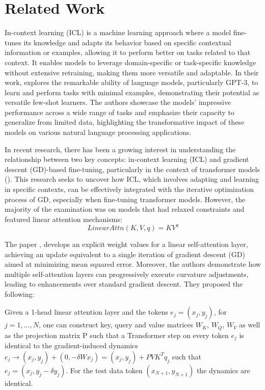 \documentclass[11pt]{article}
\begin{document}
\section{Related Work}
In-context learning (ICL) is a machine learning approach where a model fine-tunes its knowledge and adapts its behavior based on specific contextual information or examples, allowing it to perform better on tasks related to that context.
It enables models to leverage domain-specific or task-specific knowledge without extensive retraining, making them more versatile and adaptable.
In their work, \cite{NEURIPS2020_1457c0d6} explores the remarkable ability of language models, particularly GPT-3, to learn and perform tasks with minimal examples, demonstrating their potential as versatile few-shot learners.
The authors showcase the models' impressive performance across a wide range of tasks and emphasize their capacity to generalize from limited data, highlighting the transformative impact of these models on various natural language processing applications.

In recent research, there has been a growing interest in understanding the relationship between two key concepts: in-context learning (ICL) and gradient descent (GD)-based fine-tuning, particularly in the context of transformer models (\cite{pmlr-v202-von-oswald23a,2022arXiv221210559D}).
This research seeks to uncover how ICL, which involves adapting and learning in specific contexts, can be effectively integrated with the iterative optimization process of GD, especially when fine-tuning transformer models.
However, the majority of the examination was on models that had relaxed constraints and featured linear attention mechanisms:
\begin{equation}
	LinearAttn(K,V,q)=KV^q
\end{equation}

The paper \cite{pmlr-v202-von-oswald23a}, develops an explicit weight values for a linear self-attention layer, achieving an update equivalent to a single iteration of gradient descent (GD) aimed at minimizing mean squared error. Moreover, the authors demonstrate how multiple self-attention layers can progressively execute curvature adjustments, leading to enhancements over standard gradient descent.
They proposed the following:

Given a 1-head linear attention layer and
the tokens $e_{j} = (x_{j},y_{j})$, for $j = 1, . . . , N$, one can construct key, query and value matrices $W_{K}$, $W_{Q}$, $W_{V}$ as well
as the projection matrix P such that a Transformer step on
every token $e_j$ is identical to the gradient-induced dynamics $e_j \rightarrow (x_j , y_j ) + (0, - \delta W x_j ) = (x_j , y_j ) + PVK^{T}q_j$
such that $e_j = (x_j , y_j - \delta y_j )$. For the test data token
$(x_{N+1}, y_{N+1})$ the dynamics are identical.
\end{document}

